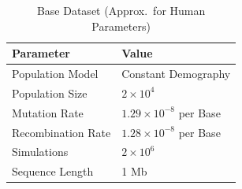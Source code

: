 \documentclass[9pt,twoside]{pnas-new} %
\begin{document}
\begin{table}[b]
    \centering
    \caption{Base Dataset (Approx.\ for Human Parameters)}
    \label{tab:base-dataset}
    \begin{tabular}{ll}
        \toprule
        \textbf{Parameter} & \textbf{Value} \\
        \midrule
        Population Model           & Constant Demography \\
        Population Size            & $2 \times 10^4$ \\
        Mutation Rate              & $1.29 \times 10^{-8}$ per Base \\
        Recombination Rate         & $1.28 \times 10^{-8}$  per Base\\
        Simulations      & $2 \times 10^6$ \\
        Sequence Length            & 1 Mb \\
        \bottomrule
    \end{tabular}
\end{table}
\end{document}
